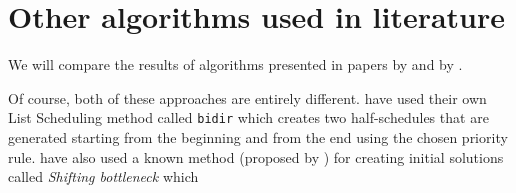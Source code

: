 \documentclass[14pt]{article}
\begin{document}
\section{Other algorithms used in literature}

We will compare the results of algorithms presented in papers by \citet{amico-trubian} and by \citet{pezzella}.

Of course, both of these approaches are entirely different. \citet{amico-trubian} have used their own List Scheduling method called \texttt{bidir} which creates two half-schedules that are generated starting from the beginning and from the end using the chosen priority rule.
\citet{pezzella} have also used a known method (proposed by \citet{adams}) for creating initial solutions called \textit{Shifting bottleneck} which



\end{document}
